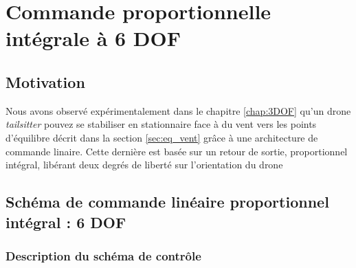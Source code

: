 \chapter{Commande proportionnelle intégrale à 6 DOF}
\minitoc
\label{chap:6DOF}

\section{Motivation}
\label{sec:motivation6DOF}
Nous avons observé expérimentalement dans le chapitre \ref{chap:3DOF} qu'un drone \textit{tailsitter} pouvez se stabiliser en stationnaire face à du vent vers les points d'équilibre décrit dans la section \ref{sec:eq_vent} grâce à une architecture de commande linaire. Cette dernière est basée sur un retour de sortie, proportionnel intégral, libérant deux degrés de liberté sur l'orientation du drone 


\section{Schéma de commande linéaire proportionnel intégral : 6 DOF}
\label{sec:6dofcmd}
\subsection{Description du schéma de contrôle}
\label{sec:ctl_sche}

